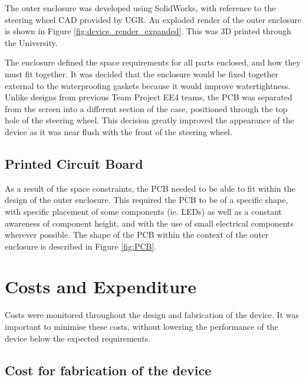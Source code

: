 \documentclass[a4paper,12pt]{article}
\begin{document}
The outer enclosure was developed using SolidWorks, with reference to the steering wheel CAD provided by UGR. An exploded render of the outer enclosure is shown in Figure \ref{fig:device_render_expanded}. This was 3D printed through the University.



The enclosure defined the space requirements for all parts enclosed, and how they must fit together. It was decided that the enclosure would be fixed together external to the waterproofing gaskets because it would improve watertightness. Unlike designs from previous Team Project EE4 teams, the PCB was separated from the screen into a different section of the case, positioned through the top hole of the steering wheel. This decision greatly improved the appearance of the device as it was near flush with the front of the steering wheel.

\subsection{Printed Circuit Board}
\label{sec:printed_circuit_board}

As a result of the space constraints, the PCB needed to be able to fit within the design of the outer enclosure. This required the PCB to be of a specific shape, with specific placement of some components (ie. LEDs) as well as a constant awareness of component height, and with the use of small electrical components wherever possible. The shape of the PCB within the context of the outer enclosure is described in Figure \ref{fig:PCB}.




\newpage
\section{Costs and Expenditure}
\label{sec:cost}

Costs were monitored throughout the design and fabrication of the device. It was important to minimise these costs, without lowering the performance of the device below the expected requirements.

\subsection{Cost for fabrication of the device}
\label{sec:device_cost}
\end{document}
